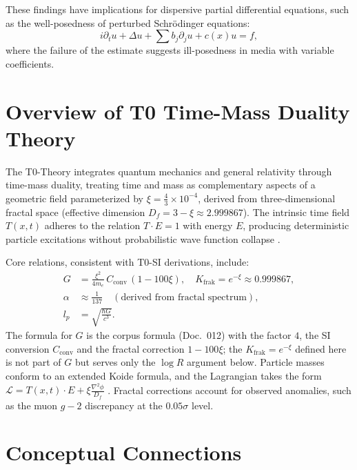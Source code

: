 	These findings have implications for dispersive partial differential equations, such as the well-posedness of perturbed Schrödinger equations:
	\begin{equation}
		i \partial_t u + \Delta u + \sum b_j \partial_j u + c(x) u = f,
	\end{equation}
	where the failure of the estimate suggests ill-posedness in media with variable coefficients.
	
	\section{Overview of T0 Time-Mass Duality Theory}
	
	The T0-Theory integrates quantum mechanics and general relativity through time-mass duality, treating time and mass as complementary aspects of a geometric field parameterized by $\xi = \frac{4}{3} \times 10^{-4}$, derived from three-dimensional fractal space (effective dimension $D_f = 3 - \xi \approx 2.999867$). The intrinsic time field $T(x,t)$ adheres to the relation $T \cdot E = 1$ with energy $E$, producing deterministic particle excitations without probabilistic wave function collapse \cite{T0_tm_erweiterung}.
	
	Core relations, consistent with T0-SI derivations, include:
	\begin{align}
		G &= \frac{\xi^2}{4m_e}\, C_\text{conv}\,(1 - 100\xi), \quad K_\text{frak} = e^{-\xi} \approx 0.999867, \label{eq:G} \\
		\alpha &\approx \frac{1}{137} \quad (\text{derived from fractal spectrum}), \label{eq:alpha} \\
		l_p &= \sqrt{\frac{\hbar G}{c^3}}. \label{eq:lp}
	\end{align}
	The formula for $G$ is the corpus formula (Doc.~012) with the factor $4$, the SI conversion $C_\text{conv}$ and the fractal correction $1-100\xi$; the $K_\text{frak} = e^{-\xi}$ defined here is not part of $G$ but serves only the $\log R$ argument below.
	Particle masses conform to an extended Koide formula, and the Lagrangian takes the form $\mathcal{L} = T(x,t) \cdot E + \xi \frac{\nabla^2 \phi}{D_f}$ \cite{T0_g2_erweiterung}. Fractal corrections account for observed anomalies, such as the muon $g-2$ discrepancy at the $0.05\sigma$ level.
	
	\section{Conceptual Connections}
	
